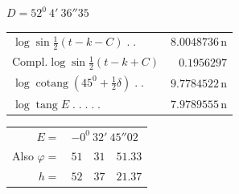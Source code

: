 \begin{center}
$D=52^0\ 4'\ 36''35$
\par\medskip
\begin{minipage}[t]{\textwidth}\centering
\begin{tabular}{lr}
$\log\sin\tfrac12(t-k-C)\;.\;.$&$8.0048736\,\mathrm n$\\
$\mathrm{Compl.}\log\sin\tfrac12(t-k+C)$&$0.1956297$\\
$\log\operatorname{cotang}(45^0+\tfrac12\delta)\;.\;.$&$9.7784522\,\mathrm n$\\\hline
$\log\operatorname{tang}E\;.\;.\;.\;.\;.$&$7.9789555\,\mathrm n$
\end{tabular}
\par\smallskip
\begin{tabular}{rl}
$E=$&$-0^0\ 32'\ 45''02$\\
Also $\varphi=$&$51\quad31\quad51.33$\\
$h=$&$52\quad37\quad21.37$
\end{tabular}
\end{minipage}
\end{center}
